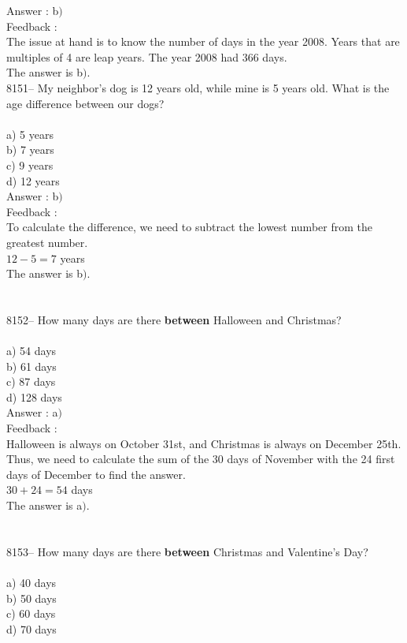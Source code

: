 \documentclass[letterpaper, 12pt]{article}
\begin{document}
Answer : b$)$\\

Feedback :\\
The issue at hand is to know the number of days in the year 2008. Years that are multiples of 4 are leap years. The year 2008 had 366 days. \\
The answer is b$)$.\\

8151-- My neighbor's dog is 12 years old, while mine is 5 years old. What is the age difference between our dogs?\\
\\
a) 5 years\\
b) 7 years\\
c) 9 years\\
d) 12 years\\

Answer : b$)$\\

Feedback :\\
To calculate the difference, we need to subtract the lowest number from the greatest number. \\
$12-5=7$ years\\
The answer is b$)$.\\
\\
\\
8152-- How many days are there \textbf{between} Halloween and Christmas?\\
\\
a) 54 days\\
b) 61 days\\
c) 87 days\\
d) 128 days\\

Answer : a$)$\\

Feedback :\\
Halloween is always on October 31st, and Christmas is always on December 25th. Thus, we need to calculate the sum of the 30 days of November with the 24 first days of December to find the answer.\\
$30+24=54$ days\\
The answer is a$)$.\\
\\
\\
8153-- How many days are there \textbf{between} Christmas and Valentine's Day?\\
\\
a) 40 days\\
b) 50 days\\
c) 60 days\\
d) 70 days\\
\end{document}
